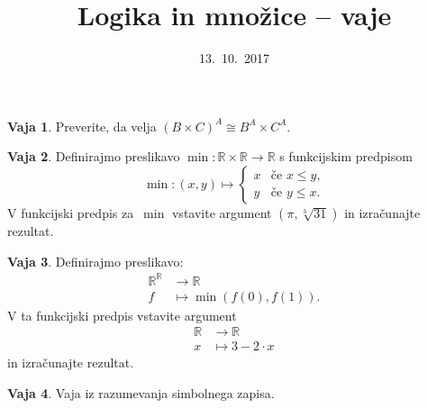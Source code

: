 \documentclass{article}
\newcommand{\RR}{\mathbb{R}}
\theoremstyle{definition}
\newtheorem{vaja}{Vaja}
\begin{document}
\title{Logika in množice -- vaje}
\date{13.~10.~2017}
\maketitle

\begin{vaja}
  Preverite, da velja $(B \times C)^A \cong B^A \times C^A$.
\end{vaja}

\begin{vaja}
  Definirajmo preslikavo $\min : \RR \times \RR \to \RR$ s funkcijskim predpisom
  \begin{equation*}
    \min : (x, y) \mapsto
    \begin{cases}
      x & \text{če $x \leq y$,} \\
      y & \text{če $y \leq x$.}
    \end{cases}
  \end{equation*}
  V funkcijski predpis za~$\min$ vstavite argument $(\pi, \sqrt[3]{31})$ in izračunajte
  rezultat.
\end{vaja}

\begin{vaja}
  Definirajmo preslikavo:
  \begin{align*}
    \RR^\RR &\to \RR \\
    f &\mapsto \min (f(0), f(1)).
  \end{align*}
  V ta funkcijski predpis vstavite argument
  \begin{align*}
    \RR &\to \RR \\
    x &\mapsto 3 - 2 \cdot x
  \end{align*}
  in izračunajte rezultat.
\end{vaja}

\begin{vaja}
  Vaja iz razumevanja simbolnega zapisa.
\end{vaja}
\end{document}
